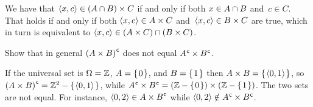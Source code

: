 \documentclass{test}  %
\begin{document}
\begin{problem}
\begin{exes}
\begin{answer}
  We have that $\langle x,c\rangle\in (A\cap B)\times C$
  if and only if both
  $x\in A\cap B$ and~$c\in C$.
  That holds if and only if both
  $\langle x,c\rangle\in A\times C$ and~$\langle x,c\rangle\in B\times C$ are true,
  which in turn is equivalent to
  $\langle x,c\rangle\in (A\times C)\cap (B\times C)$.  
\end{answer}
\begin{exercise} 
  Show that in general ${(A\times B)}^{\mspace{1mu}\mathsf{c}}$ does not equal 
  ${A}^{\mspace{1mu}\mathsf{c}}\times{B}^{\mspace{1mu}\mathsf{c}}$.
\end{exercise}
\begin{answer}
  If the universal set is $\Omega=\mathbb{Z}$,
  $A=\mbox{$\{\hspace{0.1em}0\hspace{0.1em}\}$}$, and $B=\mbox{$\{\hspace{0.1em}1\hspace{0.1em}\}$}$ then $A\times B=\mbox{$\{\hspace{0.1em}\langle0,1\rangle\hspace{0.1em}\}$}$,
  so ${(A\times B)}^{\mspace{1mu}\mathsf{c}}=\mathbb{Z}^2-\mbox{$\{\hspace{0.1em}\langle0,1\rangle\hspace{0.1em}\}$}$,
  while ${A}^{\mspace{1mu}\mathsf{c}}\times{B}^{\mspace{1mu}\mathsf{c}}=(\mathbb{Z}-\mbox{$\{\hspace{0.1em}0\hspace{0.1em}\}$})\times(\mathbb{Z}-\mbox{$\{\hspace{0.1em}1\hspace{0.1em}\}$})$.
  The two sets are not equal. 
  For instance, $\langle0,2\rangle\in {A\times B}^{\mspace{1mu}\mathsf{c}}$
  while $\langle0,2\rangle\notin{A}^{\mspace{1mu}\mathsf{c}}\times{B}^{\mspace{1mu}\mathsf{c}}$.  
\end{answer}
\end{exes}
  


\end{problem}
\end{document}
